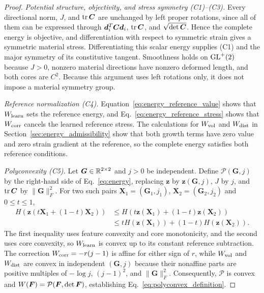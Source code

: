 \begin{proof}
\emph{Potential structure, objectivity, and stress symmetry (C1)--(C3).}
Every directional norm, $J$, and $\operatorname{tr}\bm C$ are unchanged by left proper rotations, since all of them can be expressed through $\bm d_i^T\bm C\bm d_i$, $\operatorname{tr}\bm C$, and $\sqrt{\det\bm C}$. Hence the complete energy is objective, and differentiation with respect to symmetric strain gives a symmetric material stress. Differentiating this scalar energy supplies (C1) and the major symmetry of its constitutive tangent. Smoothness holds on $\mathrm{GL}^{+}(2)$ because $J>0$, nonzero material directions have nonzero deformed length, and both cores are $C^2$. Because this argument uses left rotations only, it does not impose a material symmetry group.

\emph{Reference normalization (C4).}
Equation~\eqref{eq:energy_reference_value} shows that $W_{\rm learn}$ sets the reference energy, and Eq.~\eqref{eq:energy_reference_stress} shows that $W_{\rm corr}$ cancels the learned reference stress. The calculations for $W_{\rm vol}$ and $W_{\rm dist}$ in Section~\ref{sec:energy_admissibility} show that both growth terms have zero value and zero strain gradient at the reference, so the complete energy satisfies both reference conditions.

\emph{Polyconvexity (C5).} Let $\bm G\in\mathbb R^{2\times2}$ and $j>0$ be independent. Define $\mathcal P(\bm G,j)$ by the right-hand side of Eq.~\eqref{eq:energy}, replacing $\bm z$ by $\bm z(\bm G,j)$, $J$ by $j$, and $\operatorname{tr}\bm C$ by $\|\bm G\|_F^2$. For two such pairs $\bm X_1=(\bm G_1,j_1)$, $\bm X_2=(\bm G_2,j_2)$ and $0\leq t\leq1$,
\begin{align}
 H\!\left(\bm z(t\bm X_1+(1-t)\bm X_2)\right)
 &\leq H\!\left(t\bm z(\bm X_1)+(1-t)\bm z(\bm X_2)\right)\nonumber\\
 &\leq tH(\bm z(\bm X_1))+(1-t)H(\bm z(\bm X_2)).
 \label{eq:convex_composition_proof}
\end{align}
The first inequality uses feature convexity and core monotonicity, and the second uses core convexity, so $W_{\rm learn}$ is convex up to its constant reference subtraction. The correction $W_{\rm corr}=-r(j-1)$ is affine for either sign of $r$, while $W_{\rm vol}$ and $W_{\rm dist}$ are convex in independent $(\bm G,j)$ because their nonaffine parts are positive multiples of $-\log j$, $(j-1)^2$, and $\|\bm G\|_F^2$. Consequently, $\mathcal P$ is convex and $W(\bm F)=\mathcal P(\bm F,\det\bm F)$, establishing Eq.~\eqref{eq:polyconvex_definition}.


\end{proof}
